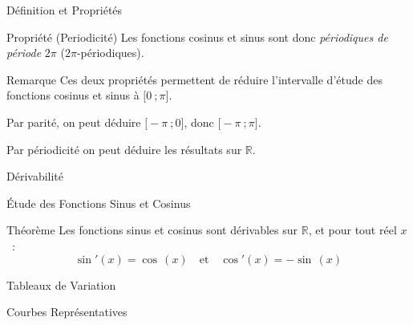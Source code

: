 \documentclass{coursbook}
\begin{document}
\begin{Gpartie}{Définition et Propriétés}
\begin{Spartie}{Propriété (Periodicité)}
            Les fonctions cosinus et sinus sont donc \emph{périodiques de période} $2\pi$ ($2\pi$-périodiques).
        \end{Spartie}
        \begin{Spartie}{Remarque} 
            Ces deux propriétés permettent de réduire l'intervalle d'étude des fonctions cosinus et sinus à $\big[0~;\pi\big]$.

            Par parité, on peut déduire $\big[-\pi~;0\big]$, donc $\big[-\pi~;\pi\big]$.
            
            Par périodicité on peut déduire les résultats sur $\mathbb{R}$.
        \end{Spartie}
    \end{Gpartie}
    \begin{Gpartie}{Dérivabilité} 
        \begin{Spartie}{Étude des Fonctions Sinus et Cosinus} 
            \begin{SSpartie}{Théorème} 
                Les fonctions sinus et cosinus sont dérivables sur $\mathbb{R}$, et pour tout réel $x$~: \[\boxed{\sin'(x)=\cos\,(x)}\quad\text{et}\quad\boxed{\cos'(x)=-\sin\,(x)}\]
            \end{SSpartie}
            \begin{SSpartie}{Tableaux de Variation} 
                \begin{center}
                    \parbox{\linewidth}{}
                \end{center}
            \end{SSpartie}
            \begin{SSpartie}{Courbes Représentatives} 

\end{SSpartie}
\end{Spartie}
\end{Gpartie}
\end{document}
